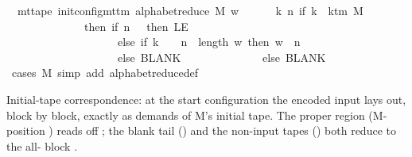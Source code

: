 \begin{isabellebody}
\ \ {\isachardoublequoteopen}mt{\isacharunderscore}{\kern0pt}tape\ {\isacharparenleft}{\kern0pt}init{\isacharunderscore}{\kern0pt}config{\isacharunderscore}{\kern0pt}mttm\ {\isacharparenleft}{\kern0pt}alphabet{\isacharunderscore}{\kern0pt}reduce\ M{\isacharparenright}{\kern0pt}\ w{\isacharprime}{\kern0pt}{\isacharparenright}{\kern0pt}\isanewline
\ \ \ \ \ {\isacharequal}{\kern0pt}\ {\isacharparenleft}{\kern0pt}{\isasymlambda}k\ n{\isachardot}{\kern0pt}\ if\ k\ {\isacharless}{\kern0pt}\ k{\isacharunderscore}{\kern0pt}tm\ M\isanewline
\ \ \ \ \ \ \ \ \ \ \ \ \ \ then\ {\isacharparenleft}{\kern0pt}if\ n\ {\isacharequal}{\kern0pt}\ {}\ then\ LE{}\isanewline
\ \ \ \ \ \ \ \ \ \ \ \ \ \ \ \ \ \ \ \ else\ if\ k\ {\isacharequal}{\kern0pt}\ {}\ {\isasymand}\ n\ {\isasymle}\ length\ w{\isacharprime}{\kern0pt}\ then\ w{\isacharprime}{\kern0pt}\ {\isacharbang}{\kern0pt}\ {\isacharparenleft}{\kern0pt}n\ {\isacharminus}{\kern0pt}\ {}{\isacharparenright}{\kern0pt}\isanewline
\ \ \ \ \ \ \ \ \ \ \ \ \ \ \ \ \ \ \ \ else\ BLANK{}{\isacharparenright}{\kern0pt}\isanewline
\ \ \ \ \ \ \ \ \ \ \ \ \ \ else\ BLANK{}{\isacharparenright}{\kern0pt}{\isachardoublequoteclose}\isanewline
%
\isadelimproof
\ \ %
\endisadelimproof
%
\isatagproof
{}\isamarkupfalse%
\ {\isacharparenleft}{\kern0pt}cases\ M{\isacharparenright}{\kern0pt}\ {\isacharparenleft}{\kern0pt}simp\ add{\isacharcolon}{\kern0pt}\ alphabet{\isacharunderscore}{\kern0pt}reduce{\isacharunderscore}{\kern0pt}def{\isacharparenright}{\kern0pt}%
\endisatagproof
{\isafoldproof}%
%
\isadelimproof
%
\endisadelimproof
%
\begin{isamarkuptext}%
Initial-tape correspondence: at the start configuration the
  encoded input  lays out, block by
  block, exactly as  demands of M's initial tape.
  The proper region (M-position ) reads off
  ; the blank tail () and the
  non-input tapes () both reduce to the all-
  block .%
\end{isamarkuptext}\isamarkuptrue%

\end{isabellebody}
